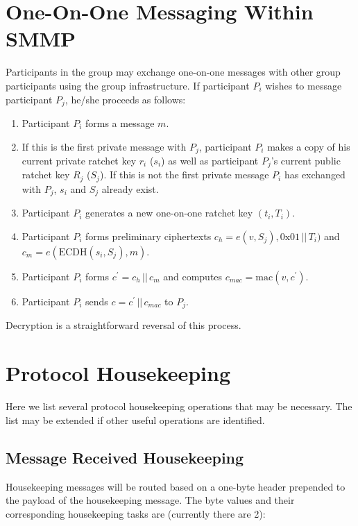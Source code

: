 \documentclass[%
preprint,
amsmath,amssymb,
aps,
prb,
floatfix,
]{revtex4-1}
\begin{document}
\section{\label{sec:im}One-On-One Messaging Within SMMP}
Participants in the group may exchange one-on-one messages with other group
participants using the group infrastructure. If participant $P_i$ wishes to
message participant $P_j$, he/she proceeds as follows:
\begin{enumerate}
\item Participant $P_i$ forms a message $m$.
\item If this is the first private message with $P_j$, participant $P_i$ makes
a copy of his current private ratchet key $r_i$
($s_i$) as well as participant $P_j$'s current public ratchet key $R_j$ ($S_j$).
If this is not the first private message $P_i$ has exchanged with $P_j$,
$s_i$ and $S_j$ already exist.
\item Participant $P_i$ generates a new one-on-one ratchet key $(t_i, T_i)$.
\item Participant $P_i$ forms preliminary ciphertexts $c_h = e(v, S_j), 0\mathrm{x}01
\, || \, T_i)$ and $c_m = e(\mathrm{ECDH}(s_i, S_j), m)$.
\item Participant $P_i$ forms $c^\prime = c_h \, || \, c_m$ and computes $c_{mac} =
\mathrm{mac}(v, c^\prime)$.
\item Participant $P_i$ sends $c = c^\prime \, || \, c_{mac}$ to $P_j$.
\end{enumerate}
Decryption is a straightforward reversal of this process.

\section{\label{sec:housekeeping}Protocol Housekeeping}
Here we list several protocol housekeeping operations that may be necessary.
The list may be extended if other useful operations are identified.

\subsection{\label{sec:receivehousekeeping}Message Received Housekeeping}
Housekeeping messages will be routed based on a one-byte header prepended to the
payload of the housekeeping message. The byte values and their corresponding
housekeeping tasks are (currently there are 2): \\
\end{document}
